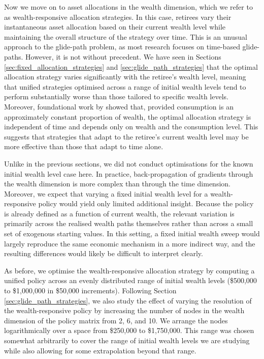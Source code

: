 \documentclass[11pt]{article}
\begin{document}
Now we move on to asset allocations in the wealth dimension, which we refer to as wealth-responsive allocation strategies. In this case, retirees vary their instantaneous asset allocation based on their current wealth level while maintaining the overall structure of the strategy over time. This is an unusual approach to the glide-path problem, as most research focuses on time-based glide-paths. However, it is not without precedent. We have seen in Sections \ref{sec:fixed_allocation_strategies} and \ref{sec:glide_path_strategies} that the optimal allocation strategy varies significantly with the retiree's wealth level, meaning that unified strategies optimised across a range of initial wealth levels tend to perform substantially worse than those tailored to specific wealth levels. Moreover, foundational work by \textcite{merton1969lifetime} showed that, provided consumption is an approximately constant proportion of wealth, the optimal allocation strategy is independent of time and depends only on wealth and the consumption level. This suggests that strategies that adapt to the retiree's current wealth level may be more effective than those that adapt to time alone.

Unlike in the previous sections, we did not conduct optimisations for the known initial wealth level case here. In practice, back-propagation of gradients through the wealth dimension is more complex than through the time dimension. Moreover, we expect that varying a fixed initial wealth level for a wealth-responsive policy would yield only limited additional insight. Because the policy is already defined as a function of current wealth, the relevant variation is primarily across the realised wealth paths themselves rather than across a small set of exogenous starting values. In this setting, a fixed initial wealth sweep would largely reproduce the same economic mechanism in a more indirect way, and the resulting differences would likely be difficult to interpret clearly.

As before, we optimise the wealth-responsive allocation strategy by computing a unified policy across an evenly distributed range of initial wealth levels (\$500,000 to \$1,000,000 in \$50,000 increments). Following Section \ref{sec:glide_path_strategies}, we also study the effect of varying the resolution of the wealth-responsive policy by increasing the number of nodes in the wealth dimension of the policy matrix from 2, 6, and 10. We arrange the nodes logarithmically over a space from \$250,000 to \$1,750,000. This range was chosen somewhat arbitrarily to cover the range of initial wealth levels we are studying while also allowing for some extrapolation beyond that range.
\end{document}
